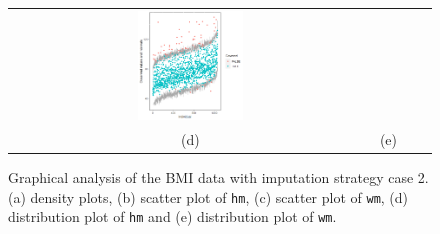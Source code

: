 \documentclass[12pt, fullpage, a4paper]{article}
\begin{document}
\begin{figure} [ht!]
\begin{tabular}{cccc}
		\includegraphics[width=0.3\textwidth]{plots/distributioncase2wm} \\
		\textnormal{(d)}  & \textnormal{(e)}  \\[6pt]
	\end{tabular}
	\caption{Graphical analysis of the BMI data with imputation strategy case 2. (a) density plots, (b) scatter plot of \texttt{hm}, (c) scatter plot of \texttt{wm}, (d) distribution plot of \texttt{hm} and (e) distribution plot of \texttt{wm}.}
	\label{fig6_10}
\end{figure}
\end{document}
